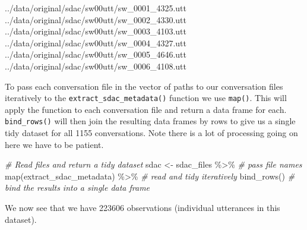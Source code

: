 \documentclass[
]{article}
\newenvironment{Shaded}{\begin{snugshade}}{\end{snugshade}}
\newcommand{\CommentTok}[1]{\textcolor[rgb]{0.56,0.35,0.01}{\textit{#1}}}
\newcommand{\FunctionTok}[1]{\textcolor[rgb]{0.00,0.00,0.00}{#1}}
\newcommand{\NormalTok}[1]{#1}
\newcommand{\OtherTok}[1]{\textcolor[rgb]{0.56,0.35,0.01}{#1}}
\newcommand{\SpecialCharTok}[1]{\textcolor[rgb]{0.00,0.00,0.00}{#1}}
\begin{document}
\begin{Shaded}
\begin{Highlighting}[]
\NormalTok{../data/original/sdac/sw00utt/sw\_0001\_4325.utt}
\NormalTok{../data/original/sdac/sw00utt/sw\_0002\_4330.utt}
\NormalTok{../data/original/sdac/sw00utt/sw\_0003\_4103.utt}
\NormalTok{../data/original/sdac/sw00utt/sw\_0004\_4327.utt}
\NormalTok{../data/original/sdac/sw00utt/sw\_0005\_4646.utt}
\NormalTok{../data/original/sdac/sw00utt/sw\_0006\_4108.utt}
\end{Highlighting}
\end{Shaded}

To pass each conversation file in the vector of paths to our conversation files iteratively to the \texttt{extract\_sdac\_metadata()} function we use \texttt{map()}. This will apply the function to each conversation file and return a data frame for each. \texttt{bind\_rows()} will then join the resulting data frames by rows to give us a single tidy dataset for all 1155 conversations. Note there is a lot of processing going on here we have to be patient.

\begin{Shaded}
\begin{Highlighting}[]
\CommentTok{\# Read files and return a tidy dataset}
\NormalTok{sdac }\OtherTok{\textless{}{-}} 
\NormalTok{  sdac\_files }\SpecialCharTok{\%\textgreater{}\%} \CommentTok{\# pass file names}
  \FunctionTok{map}\NormalTok{(extract\_sdac\_metadata) }\SpecialCharTok{\%\textgreater{}\%} \CommentTok{\# read and tidy iteratively }
  \FunctionTok{bind\_rows}\NormalTok{() }\CommentTok{\# bind the results into a single data frame}
\end{Highlighting}
\end{Shaded}

We now see that we have 223606 observations (individual utterances in this dataset).
\end{document}
